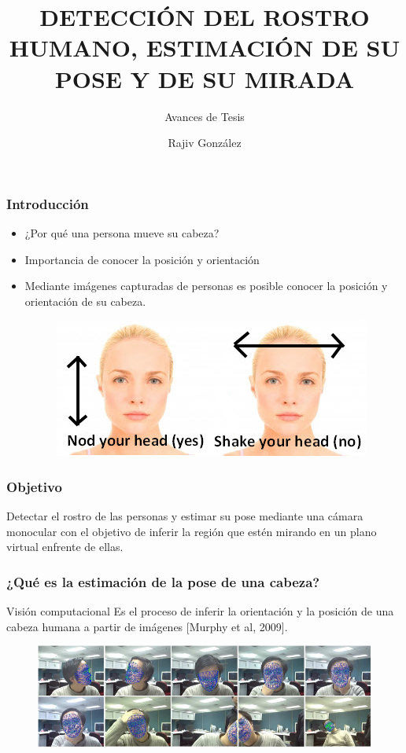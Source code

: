 \documentclass[10pt, compress]{beamer}
\title{\sc DETECCIÓN DEL ROSTRO HUMANO, ESTIMACIÓN DE SU POSE Y DE SU MIRADA}
\subtitle{Avances de Tesis}
\author{Rajiv González}
\institute{Maestría en Ciencias de la Computación, UADY}
\begin{document}
\maketitle

\begin{frame}[fragile]
	\frametitle{Introducción}
	\begin{itemize}
		\item ¿Por qué una persona mueve su cabeza?
		\item Importancia de conocer la posición y orientación
		\item Mediante imágenes capturadas de personas es posible conocer la posición y orientación de su cabeza.

		\begin{figure}[htbp]
			\centering
			\includegraphics[width=.5\textwidth]{./pictures/nod}
		\end{figure}
	\end{itemize}

\end{frame}

\begin{frame}[fragile]
\frametitle{Objetivo}
  \begin{block}{}
  Detectar el rostro de las personas y estimar su pose mediante una cámara monocular con el objetivo de inferir la región que estén mirando en un plano virtual enfrente de ellas.
  \end{block}
\end{frame}

\begin{frame}[fragile]
\frametitle{¿Qué es la estimación de la pose de una cabeza?}
  \begin{block}{Visión computacional}
	Es el proceso de inferir la orientación y la posición de una cabeza
	humana a partir de imágenes [Murphy et al, 2009].
  \end{block}
	\begin{figure}[htbp]
		\centering
		\includegraphics[width=.9\textwidth]{./pictures/pose}
	\end{figure}
\end{frame}
\end{document}
